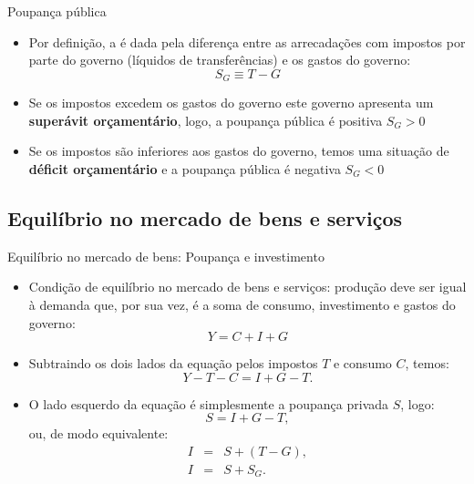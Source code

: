 \documentclass[10pt]{beamer}
\begin{document}
\begin{frame}{Poupança pública}
    \begin{itemize}
        \item Por definição, a  é dada pela diferença entre as arrecadações com impostos por parte do governo (líquidos de transferências) e os gastos do governo:
              \begin{equation}
                  S_G \equiv T - G
              \end{equation}

        \item Se os impostos excedem os gastos do governo este governo apresenta um \textbf{superávit orçamentário}, logo, a poupança pública é positiva $S_G>0$\bigskip

        \item Se os impostos são inferiores aos gastos do governo, temos uma situação de \textbf{déficit orçamentário} e a poupança pública é negativa $S_G<0$
    \end{itemize}
\end{frame}

\subsection{Equilíbrio no mercado de bens e serviços}
\begin{frame}{Equilíbrio no mercado de bens: Poupança e investimento}
    \begin{itemize}
        \item Condição de equilíbrio no mercado de bens e serviços: produção deve ser igual à demanda que, por sua vez, é a soma de consumo, investimento e gastos do governo:
              \[
                  Y = C + I + G
              \]

        \item Subtraindo os dois lados da equação pelos impostos $T$ e consumo $C$, temos:
              \[
                  Y - T - C = I + G - T.
              \]

        \item O lado esquerdo da equação é simplesmente a poupança privada $S$, logo:
              \[
                  S = I + G - T,
              \]
              ou, de modo equivalente:
              \begin{eqnarray}
                  I &=& S + (T - G), \nonumber\\
                  I &=& S + S_G. \label{aula5_eq1}
              \end{eqnarray}
    \end{itemize}
\end{frame}
\end{document}
